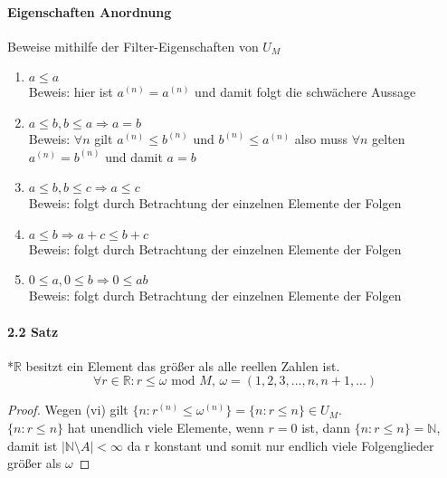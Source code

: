 \documentclass[a4paper]{article}
\begin{document}
\paragraph{Eigenschaften Anordnung} Beweise mithilfe der Filter-Eigenschaften von $ U_M $
\begin{enumerate}
     \item $ a \leqslant a $ \\
            Beweis: hier ist $ a^{(n)} = a ^{(n)} $ und damit folgt die schwächere Aussage 
     \item $ a \leqslant b, b \leqslant a \Rightarrow a = b $ \\
            Beweis: $ \forall n $ gilt $ a^{(n)} \leqslant b^{(n)} $ und $ b^{(n)} \leqslant a^{(n)} $ also muss 
            $ \forall n $ gelten $ a^{(n)} = b^{(n)} $ und damit $ a = b $
     \item $ a \leqslant b, b \leqslant c \Rightarrow a \leqslant c $ \\
            Beweis:  folgt durch Betrachtung der einzelnen Elemente der Folgen
     \item $ a \leqslant b \Rightarrow a + c \leqslant b + c $ \\ 
            Beweis:  folgt durch Betrachtung der einzelnen Elemente der Folgen
     \item $ 0 \leqslant a, 0 \leqslant b \Rightarrow 0 \leqslant ab $ \\
            Beweis:  folgt durch Betrachtung der einzelnen Elemente der Folgen

\end{enumerate}


\paragraph{2.2 Satz} *$\mathbb{R}$ besitzt ein Element das größer als alle reellen Zahlen ist. 
$$ \forall r \in \mathbb{R} : r \leqslant \omega \text{ mod } M \text{, } \omega = (1,2,3,...,n,n+1,...) $$
\begin{proof}
      Wegen (vi) gilt $ \{n: r^{(n)} \leqslant \omega^{(n)} \} = \{n: r \leqslant n\} \in U_M $. \\
      $ \{n: r \leqslant n\} $ hat unendlich viele Elemente, wenn $ r = 0 $ ist, dann $ \{n: r \leqslant n\} = \mathbb{N} $, 
      damit ist $ | \mathbb{N} \setminus A | < \infty $ da r konstant und somit nur endlich viele Folgenglieder größer als $ \omega $  
\end{proof}
\end{document}

